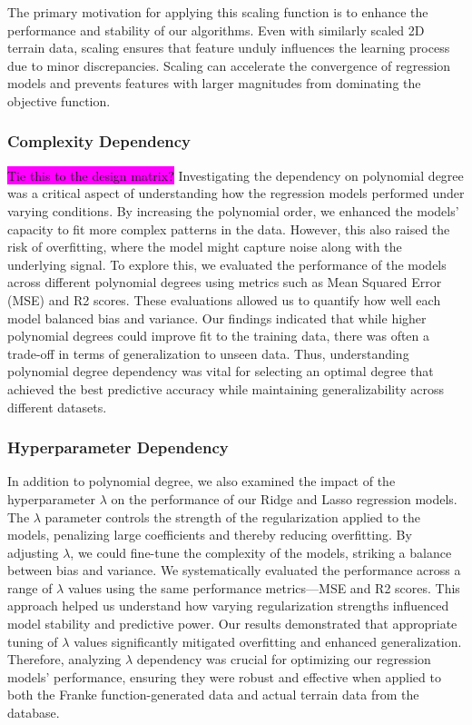 \documentclass[aps,pra,english,notitlepage,reprint,nofootinbib]{revtex4-1}  %
\begin{document}
The primary motivation for applying this scaling function is to enhance the performance and stability of our algorithms. Even with similarly scaled 2D terrain data, scaling ensures that feature unduly influences the learning process due to minor discrepancies. Scaling can accelerate the convergence of regression models and prevents features with larger magnitudes from dominating the objective function. 


\subsubsection{Complexity Dependency}
\colorbox{magenta}{Tie this to the design matrix?}
Investigating the dependency on polynomial degree was a critical aspect of understanding how the regression models performed under varying conditions. By increasing the polynomial order, we enhanced the models' capacity to fit more complex patterns in the data. However, this also raised the risk of overfitting, where the model might capture noise along with the underlying signal. To explore this, we evaluated the performance of the models across different polynomial degrees using metrics such as Mean Squared Error (MSE) and R2 scores. These evaluations allowed us to quantify how well each model balanced bias and variance. Our findings indicated that while higher polynomial degrees could improve fit to the training data, there was often a trade-off in terms of generalization to unseen data. Thus, understanding polynomial degree dependency was vital for selecting an optimal degree that achieved the best predictive accuracy while maintaining generalizability across different datasets.

\subsubsection{Hyperparameter Dependency}
In addition to polynomial degree, we also examined the impact of the hyperparameter $\lambda$ on the performance of our Ridge and Lasso regression models. The $\lambda$ parameter controls the strength of the regularization applied to the models, penalizing large coefficients and thereby reducing overfitting. By adjusting $\lambda$, we could fine-tune the complexity of the models, striking a balance between bias and variance. We systematically evaluated the performance across a range of $\lambda$ values using the same performance metrics—MSE and R2 scores. This approach helped us understand how varying regularization strengths influenced model stability and predictive power. Our results demonstrated that appropriate tuning of $\lambda$ values significantly mitigated overfitting and enhanced generalization. Therefore, analyzing $\lambda$ dependency was crucial for optimizing our regression models' performance, ensuring they were robust and effective when applied to both the Franke function-generated data and actual terrain data from the database.
\end{document}
